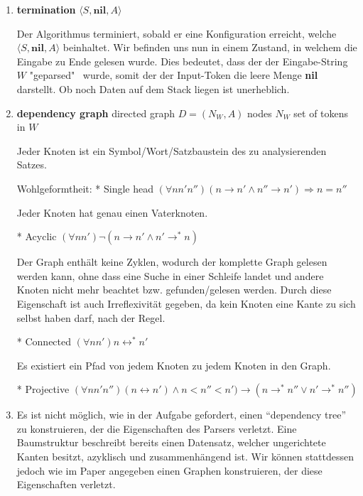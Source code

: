 \documentclass[a4paper]{scrartcl}
\begin{document}
\begin{enumerate}
\begin{enumerate}[label=(\alph*)]
            \item
            {
            \textbf{termination} $\langle S, \textbf{nil}, A \rangle$
            
            Der Algorithmus terminiert, sobald er eine Konfiguration erreicht, welche $\langle S, \textbf{nil}, A \rangle$ beinhaltet. Wir befinden uns nun in einem Zustand, in welchem die Eingabe zu Ende gelesen wurde. Dies bedeutet, dass der der Eingabe-String $W$ "geparsed" \ wurde, somit der der Input-Token die leere Menge \textbf{nil} darstellt. Ob noch Daten auf dem Stack liegen ist unerheblich.
	        }

            \item
            {
            \textbf{dependency graph}
            directed graph $D = (N_W, A)$
            nodes $N_W$ set of tokens in $W$
            
            Jeder Knoten ist ein Symbol/Wort/Satzbaustein des zu analysierenden Satzes.
            
            Wohlgeformtheit:
            * Single head  $(\forall n n' n'') (n \rightarrow n' \land n'' \rightarrow n') \Rightarrow n = n''$
            
            Jeder Knoten hat genau einen Vaterknoten.
            
            * Acyclic      $(\forall n n') \lnot (n \rightarrow n' \land n' \rightarrow^\ast n)$
            
            Der Graph enthält keine Zyklen, wodurch der komplette Graph gelesen werden kann, ohne dass eine Suche in einer Schleife landet und andere Knoten nicht mehr beachtet bzw. gefunden/gelesen werden. Durch diese Eigenschaft ist auch Irreflexivität gegeben, da kein Knoten eine Kante zu sich selbst haben darf, nach der Regel.
            
            * Connected    $(\forall n n') n \leftrightarrow^\ast n'$
            
            Es existiert ein Pfad von jedem Knoten zu jedem Knoten in den Graph.
            
            * Projective   $(\forall n n' n'') (n \leftrightarrow n') \land n < n'' < n') \rightarrow (n \rightarrow^\ast n'' \lor n' \rightarrow^\ast n'')$
	        }
            
            \item
            Es ist nicht möglich, wie in der Aufgabe gefordert, einen "`dependency tree"' zu konstruieren, der die Eigenschaften des Parsers verletzt. Eine Baumstruktur beschreibt bereits einen Datensatz, welcher ungerichtete Kanten besitzt, azyklisch und zusammenhängend ist. Wir können stattdessen jedoch wie im Paper angegeben einen Graphen konstruieren, der diese Eigenschaften verletzt.
            

\end{enumerate}
\end{enumerate}
\end{document}
